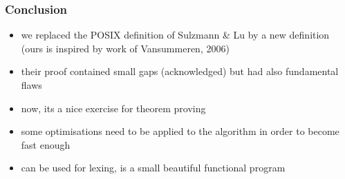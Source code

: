 \documentclass[dvipsnames,14pt,t]{beamer}
\begin{document}


\begin{frame}[c]
\frametitle{Conclusion}

\begin{itemize}

\item we replaced the POSIX definition of Sulzmann \& Lu by a
      new definition (ours is inspired by work of Vansummeren,
      2006)\medskip
  
\item their proof contained small gaps (acknowledged) but had
      also fundamental flaws\medskip

\item now, its a nice exercise for theorem proving\medskip

\item some optimisations need to be applied to the algorithm
      in order to become fast enough\medskip

\item can be used for lexing, is a small beautiful functional
      program
 
\end{itemize}

\end{frame}


\end{document}
